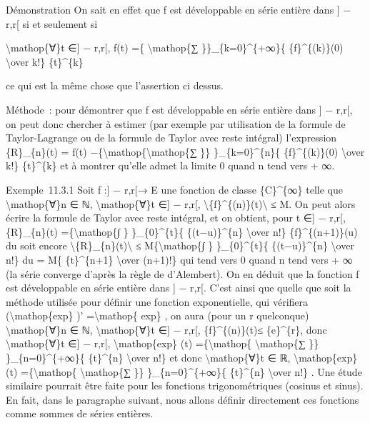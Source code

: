 \documentclass[]{article}
\begin{document}
Démonstration On sait en effet que f est développable en série entière
dans {]} − r,r{[} si et seulement si

\textbackslash{}mathop\{∀\}t ∈{]} − r,r{[}, f(t) =\{
\textbackslash{}mathop\{∑ \}\}\_\{k=0\}\^{}\{+∞\}\{ \{f\}\^{}\{(k)\}(0)
\textbackslash{}over k!\} \{t\}\^{}\{k\}

ce qui est la même chose que l'assertion ci dessus.

Méthode~: pour démontrer que f est développable en série entière dans
{]} − r,r{[}, on peut donc chercher à estimer (par exemple par
utilisation de la formule de Taylor-Lagrange ou de la formule de Taylor
avec reste intégral) l'expression \{R\}\_\{n\}(t) = f(t)
−\{\textbackslash{}mathop\{\textbackslash{}mathop\{∑ \}\}
\}\_\{k=0\}\^{}\{n\}\{ \{f\}\^{}\{(k)\}(0) \textbackslash{}over k!\}
\{t\}\^{}\{k\} et à montrer qu'elle admet la limite 0 quand n tend vers
+ ∞.

Exemple~11.3.1 Soit f :{]} − r,r{[}→ E une fonction de classe
\{C\}\^{}\{∞\} telle que \textbackslash{}mathop\{∀\}n ∈ ℕ,
\textbackslash{}mathop\{∀\}t ∈{]} − r,r{[},
\textbackslash{}\textbar{}\{f\}\^{}\{(n)\}(t)\textbackslash{}\textbar{}
≤ M. On peut alors écrire la formule de Taylor avec reste intégral, et
on obtient, pour t ∈{]} − r,r{[}, \{R\}\_\{n\}(t)
=\{\textbackslash{}mathop\{∫ \} \}\_\{0\}\^{}\{t\}\{ \{(t−u)\}\^{}\{n\}
\textbackslash{}over n!\} \{f\}\^{}\{(n+1)\}(u) du soit encore
\textbackslash{}\textbar{}\{R\}\_\{n\}(t)\textbackslash{}\textbar{} ≤
M\{\textbackslash{}mathop\{∫ \} \}\_\{0\}\^{}\{t\}\{ \{(t−u)\}\^{}\{n\}
\textbackslash{}over n!\} du = M\{ \{t\}\^{}\{n+1\} \textbackslash{}over
(n+1)!\} qui tend vers 0 quand n tend vers + ∞ (la série converge
d'après la règle de d'Alembert). On en déduit que la fonction f est
développable en série entière dans {]} − r,r{[}. C'est ainsi que quelle
que soit la méthode utilisée pour définir une fonction exponentielle,
qui vérifiera (\textbackslash{}mathop\{exp\} )'
=\textbackslash{}mathop\{ exp\} , on aura (pour un r quelconque)
\textbackslash{}mathop\{∀\}n ∈ ℕ, \textbackslash{}mathop\{∀\}t ∈{]} −
r,r{[}, \textbar{}\{f\}\^{}\{(n)\}(t)\textbar{}≤ \{e\}\^{}\{r\}, donc
\textbackslash{}mathop\{∀\}t ∈{]} − r,r{[},
\textbackslash{}mathop\{exp\} (t) =\{\textbackslash{}mathop\{
\textbackslash{}mathop\{∑ \}\} \}\_\{n=0\}\^{}\{+∞\}\{ \{t\}\^{}\{n\}
\textbackslash{}over n!\} et donc \textbackslash{}mathop\{∀\}t ∈ ℝ,
\textbackslash{}mathop\{exp\} (t) =\{\textbackslash{}mathop\{
\textbackslash{}mathop\{∑ \}\} \}\_\{n=0\}\^{}\{+∞\}\{ \{t\}\^{}\{n\}
\textbackslash{}over n!\} . Une étude similaire pourrait être faite pour
les fonctions trigonométriques (cosinus et sinus). En fait, dans le
paragraphe suivant, nous allons définir directement ces fonctions comme
sommes de séries entières.
\end{document}
